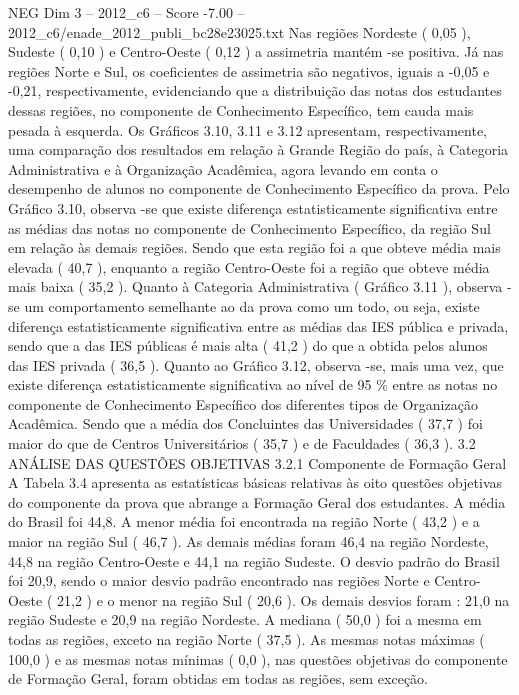 \begin{textsample}{NEG Dim 3 – 2012\_c6 – Score -7.00 – 2012\_c6/enade\_2012\_publi\_bc28e23025.txt}
Nas regiões Nordeste ( 0,05 ), Sudeste ( 0,10 ) e Centro-Oeste ( 0,12 ) a assimetria mantém -se positiva.
Já nas regiões Norte e Sul, os coeficientes de assimetria são negativos, iguais a -0,05 e -0,21, respectivamente, evidenciando que a distribuição das notas dos estudantes dessas regiões, no componente de Conhecimento Específico, tem cauda mais pesada à esquerda.
Os Gráficos 3.10, 3.11 e 3.12 apresentam, respectivamente, uma comparação dos resultados em relação à Grande Região do país, à Categoria Administrativa e à Organização Acadêmica, agora levando em conta o desempenho de alunos no componente de Conhecimento Específico da prova.
Pelo Gráfico 3.10, observa -se que existe diferença estatisticamente significativa entre as médias das notas no componente de Conhecimento Específico, da região Sul em relação às demais regiões.
Sendo que esta região foi a que obteve média mais elevada ( 40,7 ), enquanto a região Centro-Oeste foi a região que obteve média mais baixa ( 35,2 ).
Quanto à Categoria Administrativa ( Gráfico 3.11 ), observa -se um comportamento semelhante ao da prova como um todo, ou seja, existe diferença estatisticamente significativa entre as médias das IES pública e privada, sendo que a das IES públicas é mais alta ( 41,2 ) do que a obtida pelos alunos das IES privada ( 36,5 ).
Quanto ao Gráfico 3.12, observa -se, mais uma vez, que existe diferença estatisticamente significativa ao nível de 95 \% entre as notas no componente de Conhecimento Específico dos diferentes tipos de Organização Acadêmica.
Sendo que a média dos Concluintes das Universidades ( 37,7 ) foi maior do que de Centros Universitários ( 35,7 ) e de Faculdades ( 36,3 ). 3.2 ANÁLISE DAS QUESTÕES OBJETIVAS 3.2.1 Componente de Formação Geral A Tabela 3.4 apresenta as estatísticas básicas relativas às oito questões objetivas do componente da prova que abrange a Formação Geral dos estudantes.
A média do Brasil foi 44,8.
A menor média foi encontrada na região Norte ( 43,2 ) e a maior na região Sul ( 46,7 ).
As demais médias foram 46,4 na região Nordeste, 44,8 na região Centro-Oeste e 44,1 na região Sudeste.
O desvio padrão do Brasil foi 20,9, sendo o maior desvio padrão encontrado nas regiões Norte e Centro-Oeste ( 21,2 ) e o menor na região Sul ( 20,6 ).
Os demais desvios foram : 21,0 na região Sudeste e 20,9 na região Nordeste.
A mediana ( 50,0 ) foi a mesma em todas as regiões, exceto na região Norte ( 37,5 ).
As mesmas notas máximas ( 100,0 ) e as mesmas notas mínimas ( 0,0 ), nas questões objetivas do componente de Formação Geral, foram obtidas em todas as regiões, sem exceção.

\end{textsample}
